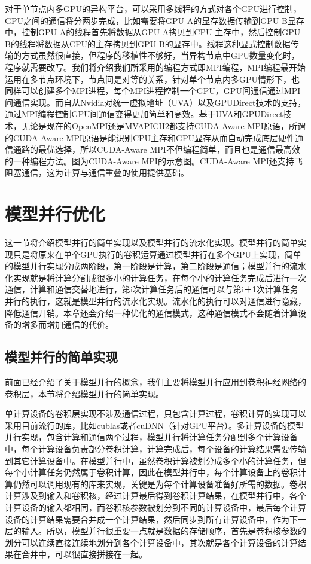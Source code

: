 对于单节点内多GPU的异构平台，可以采用多线程的方式对各个GPU进行控制，GPU之间的通信将分两步完成，比如需要将GPU A的显存数据传输到GPU B显存中，控制GPU A的线程首先将数据从GPU A拷贝到CPU 主存中，然后控制GPU B的线程将数据从CPU的主存拷贝到GPU B的显存中。线程这种显式控制数据传输的方式虽然很直接，但程序的移植性不够好，当异构节点中GPU数量变化时，程序就需要改写。我们将介绍我们所采用的编程方式即MPI编程，MPI编程最开始运用在多节点环境下，节点间是对等的关系，针对单个节点内多GPU情形下，也同样可以创建多个MPI进程，每个MPI进程控制一个GPU，GPU间通信通过MPI间通信实现。而自从Nvidia对统一虚拟地址（UVA）以及GPUDirect技术的支持，通过MPI编程控制GPU间通信变得更加简单和高效。基于UVA和GPUDirect技术，无论是现在的OpenMPI还是MVAPICH2都支持CUDA-Aware MPI原语，所谓的CUDA-Aware MPI原语是能识别CPU主存和GPU显存从而自动完成底层硬件通信通路的最优选择，所以CUDA-Aware MPI不但编程简单，而且也是通信最高效的一种编程方法。图为CUDA-Aware MPI的示意图。CUDA-Aware MPI还支持飞阻塞通信，这为计算与通信重叠的使用提供基础。

\section{模型并行优化}
这一节将介绍模型并行的简单实现以及模型并行的流水化实现。模型并行的简单实现只是将原来在单个GPU执行的卷积运算通过模型并行在多个GPU上实现，简单的模型并行实现分成两阶段，第一阶段是计算，第二阶段是通信；模型并行的流水化实现就是将计算分割成很多小的计算任务，在每个小的计算任务完成后进行一次通信，计算和通信交替地进行，第i次计算任务后的通信可以与第i＋1次计算任务并行的执行，这就是模型并行的流水化实现。流水化的执行可以对通信进行隐藏，降低通信开销。本章还会介绍一种优化的通信模式，这种通信模式不会随着计算设备的增多而增加通信的代价。

\subsection{模型并行的简单实现}
前面已经介绍了关于模型并行的概念，我们主要将模型并行应用到卷积神经网络的卷积层，本节将介绍模型并行的简单实现。

单计算设备的卷积层实现不涉及通信过程，只包含计算过程，卷积计算的实现可以采用目前流行的库，比如cublas或者cuDNN（针对GPU平台）。多计算设备的模型并行实现，包含计算和通信两个过程，模型并行将计算任务分配到多个计算设备中，每个计算设备负责部分卷积计算，计算完成后，每个设备的计算结果需要传输到其它计算设备中。在模型并行中，虽然卷积计算被划分成多个小的计算任务，但每个小计算任务仍然属于卷积计算，因此在模型并行中，每个计算设备上的卷积计算仍然可以调用现有的库来实现，关键是为每个计算设备准备好所需的数据。卷积计算涉及到输入和卷积核，经过计算最后得到卷积计算结果，在模型并行中，各个计算设备的输入都相同，而卷积核参数被划分到不同的计算设备中，最后每个计算设备的计算结果需要合并成一个计算结果，然后同步到所有计算设备中，作为下一层的输入。所以，模型并行很重要一点就是数据的存储顺序，首先是卷积核参数的划分可以连续直接连续地划分到各个计算设备中，其次就是各个计算设备的计算结果在合并中，可以很直接拼接在一起。

